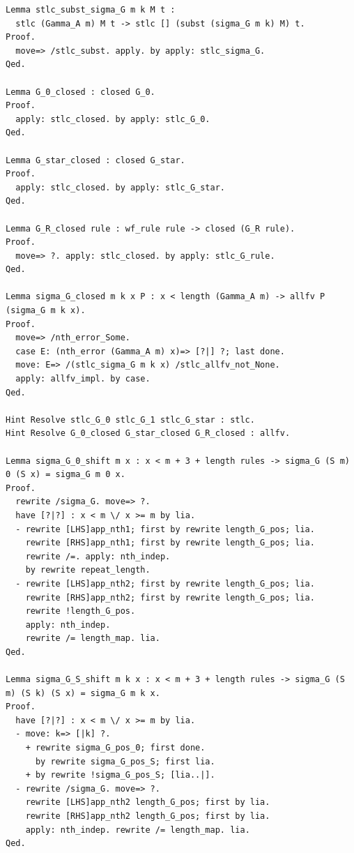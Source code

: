 \documentclass[10pt,a4paper]{amsart}
\begin{document}
\begin{lstlisting}
Lemma stlc_subst_sigma_G m k M t : 
  stlc (Gamma_A m) M t -> stlc [] (subst (sigma_G m k) M) t.
Proof.
  move=> /stlc_subst. apply. by apply: stlc_sigma_G.
Qed.

Lemma G_0_closed : closed G_0.
Proof.
  apply: stlc_closed. by apply: stlc_G_0.
Qed.

Lemma G_star_closed : closed G_star.
Proof.
  apply: stlc_closed. by apply: stlc_G_star.
Qed.

Lemma G_R_closed rule : wf_rule rule -> closed (G_R rule).
Proof.
  move=> ?. apply: stlc_closed. by apply: stlc_G_rule.
Qed.

Lemma sigma_G_closed m k x P : x < length (Gamma_A m) -> allfv P (sigma_G m k x).
Proof.
  move=> /nth_error_Some.
  case E: (nth_error (Gamma_A m) x)=> [?|] ?; last done.
  move: E=> /(stlc_sigma_G m k x) /stlc_allfv_not_None.
  apply: allfv_impl. by case.
Qed.

Hint Resolve stlc_G_0 stlc_G_1 stlc_G_star : stlc.
Hint Resolve G_0_closed G_star_closed G_R_closed : allfv.

Lemma sigma_G_0_shift m x : x < m + 3 + length rules -> sigma_G (S m) 0 (S x) = sigma_G m 0 x.
Proof.
  rewrite /sigma_G. move=> ?.
  have [?|?] : x < m \/ x >= m by lia.
  - rewrite [LHS]app_nth1; first by rewrite length_G_pos; lia.
    rewrite [RHS]app_nth1; first by rewrite length_G_pos; lia.
    rewrite /=. apply: nth_indep.
    by rewrite repeat_length.
  - rewrite [LHS]app_nth2; first by rewrite length_G_pos; lia.
    rewrite [RHS]app_nth2; first by rewrite length_G_pos; lia.
    rewrite !length_G_pos.
    apply: nth_indep.
    rewrite /= length_map. lia.
Qed.

Lemma sigma_G_S_shift m k x : x < m + 3 + length rules -> sigma_G (S m) (S k) (S x) = sigma_G m k x.
Proof.
  have [?|?] : x < m \/ x >= m by lia.
  - move: k=> [|k] ?.
    + rewrite sigma_G_pos_0; first done.
      by rewrite sigma_G_pos_S; first lia.
    + by rewrite !sigma_G_pos_S; [lia..|].
  - rewrite /sigma_G. move=> ?.
    rewrite [LHS]app_nth2 length_G_pos; first by lia.
    rewrite [RHS]app_nth2 length_G_pos; first by lia.
    apply: nth_indep. rewrite /= length_map. lia.
Qed.


\end{lstlisting}
\end{document}
